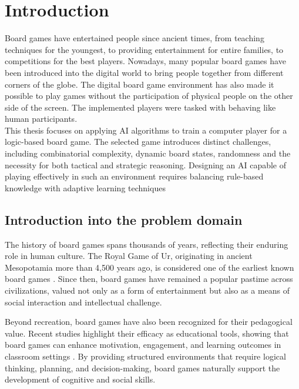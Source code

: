 \chapter{Introduction}
Board games have entertained people since ancient times, from teaching techniques for the youngest, to providing entertainment for entire families, to competitions for the best players. Nowadays, many popular board games have been introduced into the digital world to bring people together from different corners of the globe. The digital board game environment has also made it possible to play games without the participation of physical people on the other side of the screen. The implemented players were tasked with behaving like human participants.
\\
This thesis focuses on applying AI algorithms to train a computer player for a logic-based board game. The selected game introduces distinct challenges, including combinatorial complexity, dynamic board states, randomness and the necessity for both tactical and strategic reasoning. Designing an AI capable of playing effectively in such an environment requires balancing rule-based knowledge with adaptive learning techniques
\section{Introduction into the problem domain}



The history of board games spans thousands of years, reflecting their enduring role in human culture. The Royal Game of Ur, originating in ancient Mesopotamia more than 4,500 years ago, is considered one of the earliest known board games \cite{cdi_proquest_journals_2781731625}. Since then, board games have remained a popular pastime across civilizations, valued not only as a form of entertainment but also as a means of social interaction and intellectual challenge.

Beyond recreation, board games have also been recognized for their pedagogical value. Recent studies highlight their efficacy as educational tools, showing that board games can enhance motivation, engagement, and learning outcomes in classroom settings \cite{JipaClaudia2023TIOU}. By providing structured environments that require logical thinking, planning, and decision-making, board games naturally support the development of cognitive and social skills.

